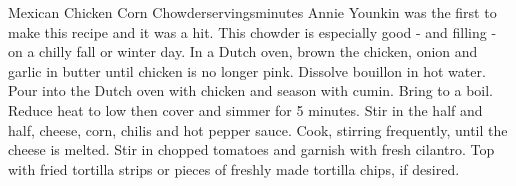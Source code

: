 \begin{recipe}{Mexican Chicken Corn Chowder}{\unit[6-8]{servings}}{\unit[60]{minutes}}
\freeform Annie Younkin was the first to make this recipe and it was a hit. This chowder is especially good - and filling - on a chilly fall or winter day.
In a Dutch oven, brown the chicken, onion and garlic in butter until chicken is no longer pink.
Dissolve bouillon in hot water. Pour into the Dutch oven with chicken and season with cumin. Bring to a boil. Reduce heat to low then cover and simmer for 5 minutes.
Stir in the half and half, cheese, corn, chilis and hot pepper sauce. Cook, stirring frequently, until the cheese is melted.
Stir in chopped tomatoes and garnish with fresh cilantro. Top with fried tortilla strips or pieces of freshly made tortilla chips, if desired.
\end{recipe}